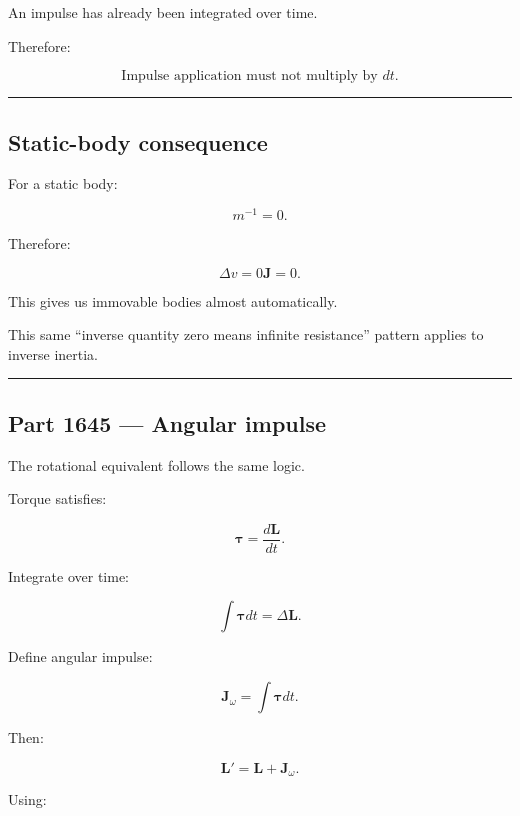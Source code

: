 An impulse has already been integrated over time.

Therefore:

\[
\boxed{
\text{Impulse application must not multiply by }dt.
}
\]

\begin{center}\rule{0.5\linewidth}{0.5pt}\end{center}

\subsection{Static-body consequence}\label{06-engine-ii-ch036-static-body-consequence}

\hypertarget{06-engine-ii-ch036-static-body-consequence}{}

For a static body:

\[
m^{-1}=0.
\]

Therefore:

\[
\Delta v
=
0\mathbf J
=
0.
\]

This gives us immovable bodies almost automatically.

This same ``inverse quantity zero means infinite resistance'' pattern applies to inverse inertia.

\begin{center}\rule{0.5\linewidth}{0.5pt}\end{center}

\subsection{Part 1645 --- Angular impulse}\label{06-engine-ii-ch036-part-1645-angular-impulse}

\hypertarget{06-engine-ii-ch036-part-1645-angular-impulse}{}

The rotational equivalent follows the same logic.

Torque satisfies:

\[
\boldsymbol\tau
=
\frac{d\mathbf L}{dt}.
\]

Integrate over time:

\[
\int\boldsymbol\tau dt
=
\Delta\mathbf L.
\]

Define angular impulse:

\[
\boxed{
\mathbf J_\omega
=
\int\boldsymbol\tau dt.
}
\]

Then:

\[
\boxed{
\mathbf L'
=
\mathbf L+
\mathbf J_\omega.
}
\]

Using:

